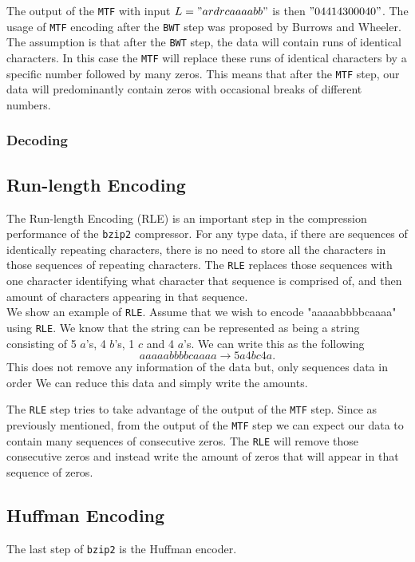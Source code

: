 \documentclass{article}
\begin{document}
The output of the \texttt{MTF} with input \(L = "ardrcaaaabb"\) is then \("04414300040"\). The usage of \texttt{MTF} encoding after the \texttt{BWT} step was proposed by Burrows and Wheeler. The assumption is that after the \texttt{BWT} step, the data will contain runs of identical characters. In this case the \texttt{MTF} will replace these runs of identical characters by a specific number followed by many zeros. This means that after the \texttt{MTF} step, our data will predominantly contain zeros with occasional breaks of different numbers.

\subsubsection{Decoding}


\subsection{Run-length Encoding}
The Run-length Encoding (RLE) is an important step in the compression performance of the \texttt{bzip2} compressor.
For any type data, if there are sequences of identically repeating characters, there is no need to store all the characters in those sequences of repeating characters. The \texttt{RLE} replaces those sequences with one character identifying what character that sequence is comprised of, and then amount of characters appearing in that sequence.\\
We show an example of \texttt{RLE}. Assume that we wish to encode "aaaaabbbbcaaaa" using \texttt{RLE}. We know that the string can be represented as being a string consisting of 5 \(a\)'s, 4 \(b\)'s, 1 \(c\) and 4 \(a\)'s. We can write this as the following
\[
aaaaabbbbcaaaa \rightarrow 5a4bc4a.
\]
This does not remove any information of the data but, only sequences data in order We can reduce this data and simply write the amounts. 

The \texttt{RLE} step tries to take advantage of the output of the \texttt{MTF} step. Since as previously mentioned, from the output of the \texttt{MTF} step we can expect our data to contain many sequences of consecutive zeros. The \texttt{RLE} will remove those consecutive zeros and instead write the amount of zeros that will appear in that sequence of zeros.





\subsection{Huffman Encoding}
The last step of \texttt{bzip2} is the Huffman encoder.
\end{document}
